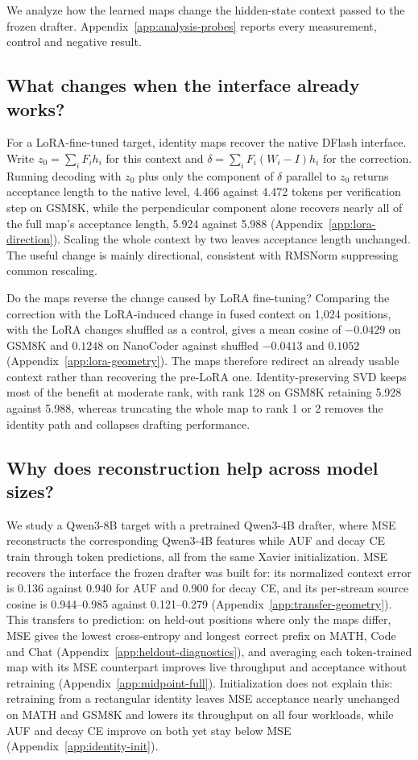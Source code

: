 We analyze how the learned maps change the hidden-state context passed to the frozen drafter. Appendix~\ref{app:analysis-probes} reports every measurement, control and negative result.

\subsection{What changes when the interface already works?}
\label{sec:analysis-lora}
For a LoRA-fine-tuned target, identity maps recover the native DFlash interface. Write $z_0=\sum_i F_i h_i$ for this context and $\delta=\sum_i F_i(W_i-I)h_i$ for the correction. Running decoding with $z_0$ plus only the component of $\delta$ parallel to $z_0$ returns acceptance length to the native level, 4.466 against 4.472 tokens per verification step on GSM8K, while the perpendicular component alone recovers nearly all of the full map's acceptance length, 5.924 against 5.988 (Appendix~\ref{app:lora-direction}). Scaling the whole context by two leaves acceptance length unchanged. The useful change is mainly directional, consistent with RMSNorm suppressing common rescaling.

Do the maps reverse the change caused by LoRA fine-tuning? Comparing the correction with the LoRA-induced change in fused context on 1,024 positions, with the LoRA changes shuffled as a control, gives a mean cosine of $-0.0429$ on GSM8K and $0.1248$ on NanoCoder against shuffled $-0.0413$ and $0.1052$ (Appendix~\ref{app:lora-geometry}). The maps therefore redirect an already usable context rather than recovering the pre-LoRA one. Identity-preserving SVD keeps most of the benefit at moderate rank, with rank 128 on GSM8K retaining 5.928 against 5.988, whereas truncating the whole map to rank 1 or 2 removes the identity path and collapses drafting performance.

\subsection{Why does reconstruction help across model sizes?}
\label{sec:analysis-transfer}
We study a Qwen3-8B target with a pretrained Qwen3-4B drafter, where MSE reconstructs the corresponding Qwen3-4B features while AUF and decay CE train through token predictions, all from the same Xavier initialization. MSE recovers the interface the frozen drafter was built for: its normalized context error is 0.136 against 0.940 for AUF and 0.900 for decay CE, and its per-stream source cosine is 0.944--0.985 against 0.121--0.279 (Appendix~\ref{app:transfer-geometry}). This transfers to prediction: on held-out positions where only the maps differ, MSE gives the lowest cross-entropy and longest correct prefix on MATH, Code and Chat (Appendix~\ref{app:heldout-diagnostics}), and averaging each token-trained map with its MSE counterpart improves live throughput and acceptance without retraining (Appendix~\ref{app:midpoint-full}). Initialization does not explain this: retraining from a rectangular identity leaves MSE acceptance nearly unchanged on MATH and GSM8K and lowers its throughput on all four workloads, while AUF and decay CE improve on both yet stay below MSE (Appendix~\ref{app:identity-init}).
